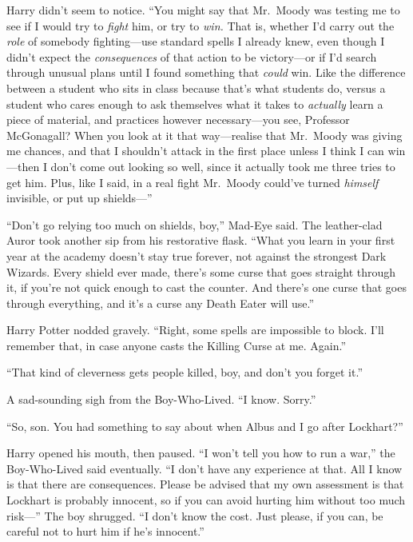 Harry didn't seem to notice. ``You might say that Mr.~Moody was testing
me to see if I would try to \emph{fight} him, or try to \emph{win.} That
is, whether I'd carry out the \emph{role} of somebody fighting---use
standard spells I already knew, even though I didn't expect the
\emph{consequences} of that action to be victory---or if I'd search
through unusual plans until I found something that \emph{could} win.
Like the difference between a student who sits in class because that's
what students do, versus a student who cares enough to ask themselves
what it takes to \emph{actually} learn a piece of material, and
practices however necessary---you see, Professor McGonagall? When you
look at it that way---realise that Mr.~Moody was giving me chances, and
that I shouldn't attack in the first place unless I think I can
win---then I don't come out looking so well, since it actually took me
three tries to get him. Plus, like I said, in a real fight Mr.~Moody
could've turned \emph{himself} invisible, or put up shields---''

``Don't go relying too much on shields, boy,'' Mad-Eye said. The
leather-clad Auror took another sip from his restorative flask. ``What
you learn in your first year at the academy doesn't stay true forever,
not against the strongest Dark Wizards. Every shield ever made, there's
some curse that goes straight through it, if you're not quick enough to
cast the counter. And there's one curse that goes through everything,
and it's a curse any Death Eater will use.''

Harry Potter nodded gravely. ``Right, some spells are impossible to
block. I'll remember that, in case anyone casts the Killing Curse at me.
Again.''

``That kind of cleverness gets people killed, boy, and don't you forget
it.''

A sad-sounding sigh from the Boy-Who-Lived. ``I know. Sorry.''

``So, son. You had something to say about when Albus and I go after
Lockhart?''

Harry opened his mouth, then paused. ``I won't tell you how to run a
war,'' the Boy-Who-Lived said eventually. ``I don't have any experience
at that. All I know is that there are consequences. Please be advised
that my own assessment is that Lockhart is probably innocent, so if you
can avoid hurting him without too much risk---'' The boy shrugged. ``I
don't know the cost. Just please, if you can, be careful not to hurt him
if he's innocent.''

